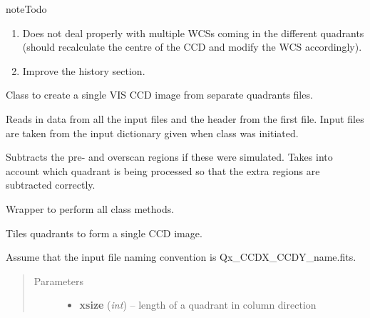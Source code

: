\documentclass[a4paper,11pt,english]{sphinxmanual}
\begin{document}
\begin{notice}{note}{Todo}
\begin{enumerate}
\item {} 
Does not deal properly with multiple WCSs coming in the different quadrants (should recalculate the
centre of the CCD and modify the WCS accordingly).

\item {} 
Improve the history section.

\end{enumerate}
\end{notice}

\begin{fulllineitems}
\label{postproc:postproc.tileCCD.tileCCD}
Class to create a single VIS CCD image from separate quadrants files.

\begin{fulllineitems}
\label{postproc:postproc.tileCCD.tileCCD.readData}
Reads in data from all the input files and the header from the first file.
Input files are taken from the input dictionary given when class was initiated.

Subtracts the pre- and overscan regions if these were simulated. Takes into account
which quadrant is being processed so that the extra regions are subtracted correctly.

\end{fulllineitems}


\begin{fulllineitems}
\label{postproc:postproc.tileCCD.tileCCD.runAll}
Wrapper to perform all class methods.

\end{fulllineitems}


\begin{fulllineitems}
\label{postproc:postproc.tileCCD.tileCCD.tileCCD}
Tiles quadrants to form a single CCD image.

Assume that the input file naming convention is Qx\_CCDX\_CCDY\_name.fits.
\begin{quote}\begin{description}
\item[{Parameters}] \leavevmode\begin{itemize}
\item {} 
\textbf{xsize} (\emph{int}) -- length of a quadrant in column direction


\end{itemize}
\end{description}
\end{quote}
\end{fulllineitems}
\end{fulllineitems}
\end{document}
